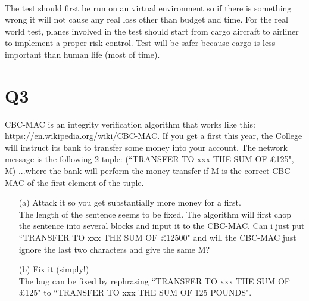 \documentclass[10pt,twoside,a4paper]{article}
\begin{document}
\\The test should first be run on an virtual environment so if there is something wrong it will not cause any real loss other than budget and time. For the real world test, planes involved in the test should start from cargo aircraft to airliner to implement a proper risk control. Test will be safer because cargo is less important than human life (most of time).
\section*{Q3}
CBC-MAC is an integrity verification algorithm that works like this: https://en.wikipedia.org/wiki/CBC-MAC. If you get a first this year, the College will instruct its bank to transfer some money into your account. The network message is the following 2-tuple: (``TRANSFER TO xxx THE SUM OF \pounds 125", M)
...where the bank will perform the money transfer if M is the correct CBC-MAC of the first element of the tuple.
\begin{itemize}
\item[(a)] Attack it so you get substantially more money for a first.\\
The length of the sentence seems to be fixed. The algorithm will first chop the sentence into several blocks and input it to the CBC-MAC. Can i just put ``TRANSFER TO xxx THE SUM OF \pounds 12500" and will the CBC-MAC just ignore the last two characters and give the same M?
\item[(b)] Fix it (simply!) \\
The bug can be fixed by rephrasing ``TRANSFER TO xxx THE SUM OF \pounds 125" to ``TRANSFER TO xxx THE SUM OF 125 POUNDS".
\end{itemize}
\end{document}
